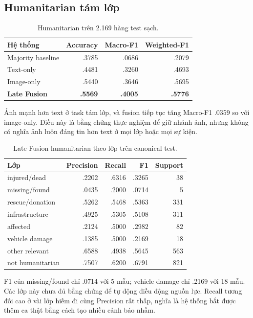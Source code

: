 \subsection{Humanitarian tám lớp}

\begin{table}[H]\centering\small
\caption{Humanitarian trên 2.169 hàng test sạch.}
\begin{tabular}{lrrr}
\toprule
\textbf{Hệ thống} & \textbf{Accuracy} & \textbf{Macro-F1} & \textbf{Weighted-F1}\\
\midrule
Majority baseline & .3785 & .0686 & .2079\\
Text-only & .4481 & .3260 & .4693\\
Image-only & .5440 & .3646 & .5695\\
\textbf{Late Fusion} & \textbf{.5569} & \textbf{.4005} & \textbf{.5776}\\
\bottomrule
\end{tabular}
\end{table}

Ảnh mạnh hơn text ở task tám lớp, và fusion tiếp tục tăng Macro-F1 .0359 so với
image-only. Điều này là bằng chứng thực nghiệm để giữ nhánh ảnh, nhưng không có
nghĩa ảnh luôn đáng tin hơn text ở mọi lớp hoặc mọi sự kiện.

\begin{table}[H]\centering\scriptsize
\caption{Late Fusion humanitarian theo lớp trên canonical test.}
\begin{tabular}{lrrrr}
\toprule
\textbf{Lớp} & \textbf{Precision} & \textbf{Recall} & \textbf{F1} & \textbf{Support}\\
\midrule
injured/dead & .2202 & .6316 & .3265 & 38\\
missing/found & .0435 & .2000 & .0714 & 5\\
rescue/donation & .5262 & .5468 & .5363 & 331\\
infrastructure & .4925 & .5305 & .5108 & 311\\
affected & .2124 & .5000 & .2982 & 82\\
vehicle damage & .1385 & .5000 & .2169 & 18\\
other relevant & .6588 & .4938 & .5645 & 563\\
not humanitarian & .7507 & .6200 & .6791 & 821\\
\bottomrule
\end{tabular}
\end{table}

F1 của missing/found chỉ .0714 với 5 mẫu; vehicle damage chỉ .2169 với 18 mẫu.
Các lớp này chưa đủ bằng chứng để tự động điều động nguồn lực. Recall tương đối
cao ở vài lớp hiếm đi cùng Precision rất thấp, nghĩa là hệ thống bắt được thêm
ca thật bằng cách tạo nhiều cảnh báo nhầm.

